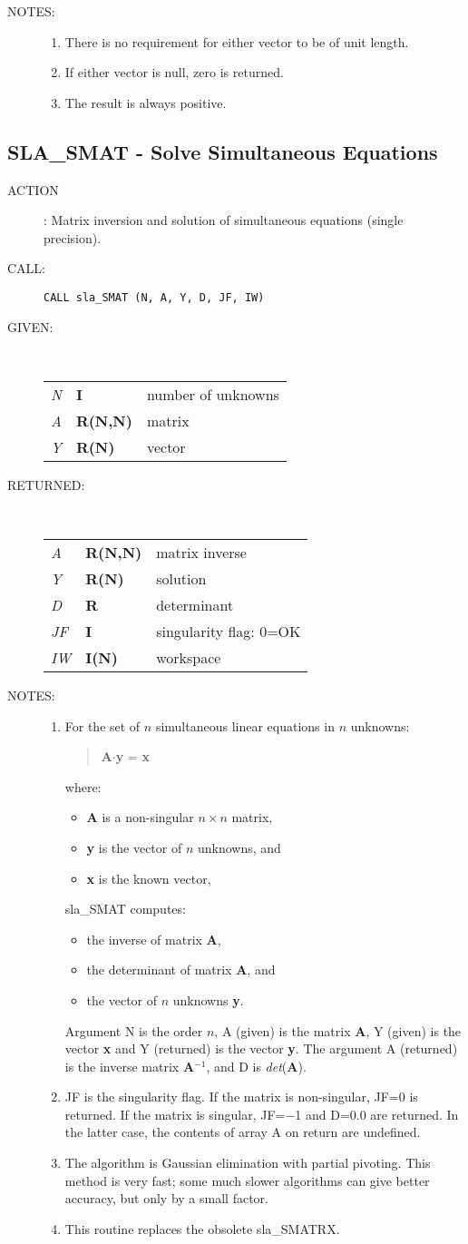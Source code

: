 \documentclass[11pt,twoside]{article}
\newcommand{\xlabel}[1]{}
\newcommand{\routine}[3]
{\hbadness=10000
  \vbox
  {
    \rule{\textwidth}{0.3mm}\\
    {\Large {\bf #1} \hfill #2 \hfill {\bf #1}}\\
    \setlength{\oldspacing}{\topsep}
    \setlength{\topsep}{0.3ex}
    \begin{description}
      #3
    \end{description}
    \setlength{\topsep}{\oldspacing}
  }
}
\renewcommand{\routine}[3]
   {
      \subsection{#1\xlabel{#1} - #2\label{#1}}
       \begin{description}
         #3
       \end{description}
   }
\newcommand{\action}[1]
{\item[ACTION]: #1}
\newcommand{\action}[1]
   {\item[ACTION:] #1}
\newcommand{\call}[1]
{\item[CALL]: \hspace{0.4em}{\tt #1}}
\newlength{\oldspacing}
\renewcommand{\call}[1]
   {
    \item[CALL:] {\tt #1}
   }
\newcommand{\args}[2]
{
  \goodbreak
  \setlength{\oldspacing}{\topsep}
  \setlength{\topsep}{0.3ex}
  \begin{description}
  \item[#1]:\\[1.5ex]
    \begin{tabular}{p{7em}p{6em}p{22em}}
      #2
    \end{tabular}
  \end{description}
  \setlength{\topsep}{\oldspacing}
}
\renewcommand{\args}[2]
   {
     \begin{description}
        \item[#1:]\\
        \begin{tabular}{p{7em}p{6em}l}
           #2
        \end{tabular}
     \end{description}
   }
\newcommand{\spec}[3]
{
  {\em {#1}} & {\bf \mbox{#2}} & {#3}
}
\newcommand{\notes}[1]
{
  \goodbreak
  \setlength{\oldspacing}{\topsep}
  \setlength{\topsep}{0.3ex}
  \begin{description}
    \item[NOTES]:
        #1
  \end{description}
  \setlength{\topsep}{\oldspacing}
}
\renewcommand{\notes}[1]
   {
      \begin{description}
         \item[NOTES:]
            #1
      \end{description}
   }
\begin{document}
\notes
{
 \begin{enumerate}
  \item There is no requirement for either vector to be of unit length.
  \item If either vector is null, zero is returned.
  \item The result is always positive.
 \end{enumerate}
}
\routine{SLA\_SMAT}{Solve Simultaneous Equations}
{
 \action{Matrix inversion and solution of simultaneous equations
         (single precision).}
 \call{CALL sla\_SMAT (N, A, Y, D, JF, IW)}
}
\args{GIVEN}
{
 \spec{N}{I}{number of unknowns} \\
 \spec{A}{R(N,N)}{matrix} \\
 \spec{Y}{R(N)}{vector}
}
\args{RETURNED}
{
 \spec{A}{R(N,N)}{matrix inverse} \\
 \spec{Y}{R(N)}{solution} \\
 \spec{D}{R}{determinant} \\
 \spec{JF}{I}{singularity flag: 0=OK} \\
 \spec{IW}{I(N)}{workspace}
}
\notes
{
 \begin{enumerate}
  \item For the set of $n$ simultaneous linear equations in $n$ unknowns:
        \begin{verse}
         {\bf A}$\cdot${\bf y} = {\bf x}
        \end{verse}
        where:
        \begin{itemize}
         \item {\bf A} is a non-singular $n \times n$ matrix,
         \item {\bf y} is the vector of $n$ unknowns, and
         \item {\bf x} is the known vector,
        \end{itemize}
        sla\_SMAT computes:
        \begin{itemize}
         \item the inverse of matrix {\bf A},
         \item the determinant of matrix {\bf A}, and
         \item the vector of $n$ unknowns {\bf y}.
        \end{itemize}
        Argument N is the order $n$, A (given) is the matrix {\bf A},
        Y (given) is the vector {\bf x} and Y (returned)
        is the vector {\bf y}.
        The argument A (returned) is the inverse matrix {\bf A}$^{-1}$,
        and D is {\it det}\/({\bf A}).
  \item JF is the singularity flag.  If the matrix is non-singular,
        JF=0 is returned.  If the matrix is singular, JF=$-$1
        and D=0.0 are returned.  In the latter case, the contents
        of array A on return are undefined.
  \item The algorithm is Gaussian elimination with partial pivoting.
        This method is very fast;  some much slower algorithms can give
        better accuracy, but only by a small factor.
  \item This routine replaces the obsolete sla\_SMATRX.
 \end{enumerate}
}
\end{document}

